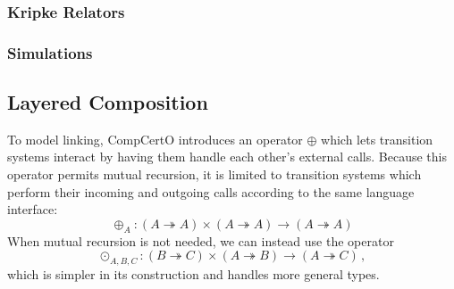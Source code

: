 \documentclass[acmsmall,screen,review,anonymous]{acmart}
\begin{document}
\subsubsection{Kripke Relators}

\subsubsection{Simulations} %

\begin{definition} \label{def:simconv}
\end{definition}

\begin{definition} \label{def:sim}
\end{definition}

\begin{definition} \label{def:ccomp}
\end{definition}

\begin{theorem} \label{thm:vcomp}
\end{theorem}



\subsection{Layered Composition} \label{sec:basic:lcomp} %

To model linking,
CompCertO introduces an operator $\oplus$
which lets transition systems interact
by having them handle each other's external calls.
Because this operator permits mutual recursion,
it is limited to transition systems which perform
their incoming and outgoing calls
according to the same language interface:
\[
  {\oplus_A} :
    (A \twoheadrightarrow A) \times
    (A \twoheadrightarrow A) \rightarrow
    (A \twoheadrightarrow A)
\]
When mutual recursion is not needed,
we can instead use the operator
\[
  {\odot_{A,B,C}} :
    (B \twoheadrightarrow C) \times
    (A \twoheadrightarrow B) \rightarrow
    (A \twoheadrightarrow C)
  \,,
\]
which is simpler in its construction
and handles more general types.

\end{document}
